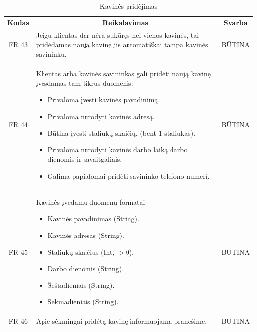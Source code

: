 \documentclass{VUMIFPSkursinis}
\begin{document}
\begin{center}
	\begin{table}[H]
	\caption{Kavinės pridėjimas}
	\begin{tabular}{|p{2cm}|p{}|p{}|}
	
	\hline
	    \rowcolor{lightgray}
		\multicolumn{3}{|c|}{Kavinės pridėjimas}\\
		
	\hline
		\multicolumn{1}{|c|}{{\bfseries Kodas}}&
		\multicolumn{1}{|c|}{{\bfseries Reikalavimas}}&
		\multicolumn{1}{|c|}{{\bfseries Svarba}}\\

	\hline
		\multicolumn{1}{|c|}{FR 43}&
		{Jeigu klientas dar nėra sukūręs nei vienos kavinės, tai pridėdamas naują kavinę jis automatiškai tampa kavinės savininku.}&
		\multicolumn{1}{|c|}{BŪTINA}\\	

	\hline
		\multicolumn{1}{|c|}{FR 44}&
		{Klientas arba kavinės savininkas gali pridėti naują kavinę įvesdamas tam tikrus duomenis:
			\begin{itemize}
				\item Privaloma įvesti kavinės pavadinimą.
				\item Privaloma nurodyti kavinės adresą.
				\item Būtina įvesti staliukų skaičių. (bent 1 staliukas).
				\item Privaloma nurodyti kavinės darbo laiką darbo dienomis ir savaitgaliais.
				\item Galima papildomai pridėti savininko telefono numerį.
			\end{itemize}}&
		\multicolumn{1}{|c|}{BŪTINA}\\	

	\hline
		\multicolumn{1}{|c|}{FR 45}&
		{Kavinės įvedamų duomenų formatai
			\begin{itemize}
				\item Kavinės pavadinimas (String).
				\item Kavinės adresas (String).
				\item Staliukų skaičius (Int, $>$0).
				\item Darbo dienomis (String).
				\item Šeštadieniais (String).
				\item Sekmadieniais (String).
			\end{itemize}}&
		\multicolumn{1}{|c|}{BŪTINA}\\	

	\hline
		\multicolumn{1}{|c|}{FR 46}&
		{Apie sėkmingai pridėtą kavinę informuojama pranešime.}&
		\multicolumn{1}{|c|}{BŪTINA}\\	


\end{tabular}
\end{table}
\end{center}
\end{document}
